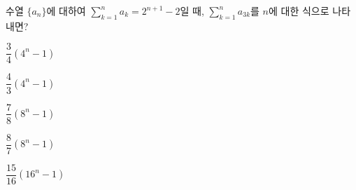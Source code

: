 수열 $\{a_n\}$에 대하여 $\displaystyle\sum_{k=1}^{n}a_k=2^{n+1}-2$일 때, $\displaystyle\sum_{k=1}^{n}a_{3k}$를 $n$에 대한 식으로 나타내면?
\begin{choices32}{\rule[-3ex]{0pt}{8ex}$\dfrac{3}{4}(4^n-1)$}{\rule[-3ex]{0pt}{8ex}$\dfrac{4}{3}(4^n-1)$}{\rule[-3ex]{0pt}{8ex}$\dfrac{7}{8}(8^n-1)$}{\rule[-3ex]{0pt}{8ex}$\dfrac{8}{7}(8^n-1)$}{\rule[-3ex]{0pt}{8ex}$\dfrac{15}{16}(16^n-1)$}\end{choices32}
